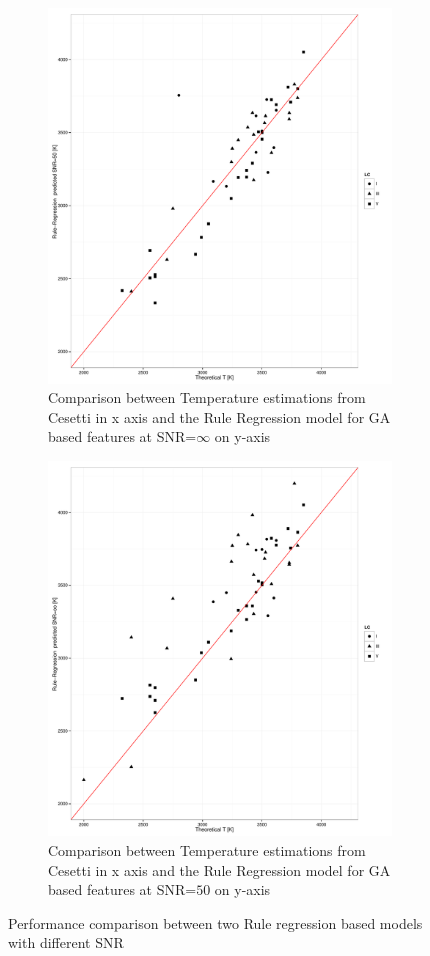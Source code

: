  
\begin {figure}
 \centering 
 \begin{subfigure}{.85\textwidth}
  \centering
  \includegraphics[width=11cm]{figs/irtf_T_rregoo_Cesetti.pdf}
  \caption{Comparison between Temperature estimations from Cesetti 
 in x axis and the Rule Regression model for GA based features 
 at SNR=$\infty$ on y-axis}
 \label{fig:ga_rr00ga_spt}
 \end{subfigure}
\begin{subfigure}{.85\textwidth}
  \centering
  \includegraphics[width=11cm]{figs/irtf_T_rreg50_Cesetti.pdf}
  \caption{Comparison between Temperature estimations from Cesetti 
 in x axis and the Rule Regression model for GA based features 
 at SNR=$50$ on y-axis}
 \label{fig:ga_rr50ga_spt}
 \end{subfigure} 
 \label {fig:comp02}
 \caption{Performance comparison between two Rule regression based models with different SNR}
\end {figure}

